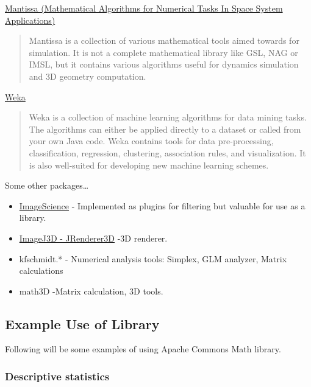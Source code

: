 \documentclass[11pt,a4paper,oneside]{report}
\begin{document}
\href{http://spaceroots.org/software/mantissa/index.html}{Mantissa (Mathematical Algorithms for Numerical Tasks In Space System Applications)}
\begin{shaded}
\begin{quote}
Mantissa is a collection of various mathematical tools aimed towards for simulation. 
It is not a complete mathematical library like GSL, NAG or IMSL, but it contains various 
algorithms useful for dynamics simulation and 3D geometry computation.
\end{quote}
\end{shaded}

\href{http://www.cs.waikato.ac.nz/ml/weka/}{Weka}
\begin{shaded}
\begin{quote}
Weka is a collection of machine learning algorithms for data mining tasks. 
The algorithms can either be applied directly to a dataset or called from your own Java code. 
Weka contains tools for data pre-processing, classification, regression, 
clustering, association rules, and visualization. 
It is also well-suited for developing new machine learning schemes.
\end{quote}
\end{shaded}

Some other packages\dots

\begin{itemize}
\item \href{http://www.imagescience.org/meijering/software/}{ImageScience} - 
Implemented as plugins for filtering but valuable for use as a library. 
\item \href{http://www.f4.htw-berlin.de/~barthel/ImageJ/ImageJ3D/ImageJ3D.html}{ImageJ3D - JRenderer3D} -3D renderer. 
\item kfschmidt.*  - Numerical analysis tools: Simplex, GLM analyzer, Matrix
calculations
\item math3D -Matrix calculation, 3D tools.  
\end{itemize}

\subsection{Example Use of Library}
Following will be some examples of using Apache Commons Math library. 
\subsubsection{Descriptive statistics}
\end{document}
